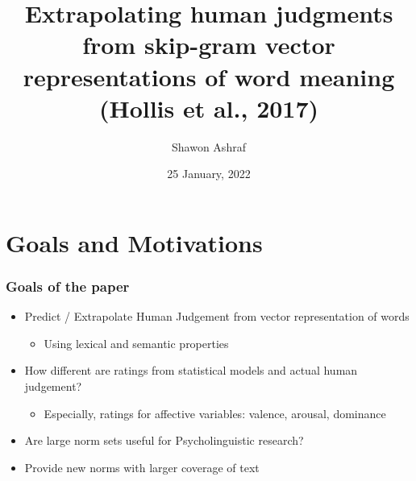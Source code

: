 \documentclass{beamer}
\title[Summary Presentation : Paper 16]{Extrapolating human judgments from skip-gram vector representations of word meaning (Hollis et al., 2017)} %
\author{Shawon Ashraf} %
\institute[IMS] %
{
Universität Stuttgart \\ %
}
\date{25 January, 2022} %
\begin{document}
\begin{frame}
\titlepage %
\end{frame}



\section{Goals and Motivations} %

\begin{frame}
\frametitle{Goals of the paper}
\begin{itemize}
    \item Predict / Extrapolate Human Judgement from vector representation of words
        \begin{itemize}
            \item Using lexical and semantic properties
        \end{itemize}
    \item How different are ratings from statistical models and actual human judgement?
        \begin{itemize}
            \item Especially, ratings for affective variables: valence, arousal, dominance
        \end{itemize}
    \item Are large norm sets useful for Psycholinguistic research?
    \item Provide new norms with larger coverage of text
\end{itemize}
\end{frame}
\end{document}
